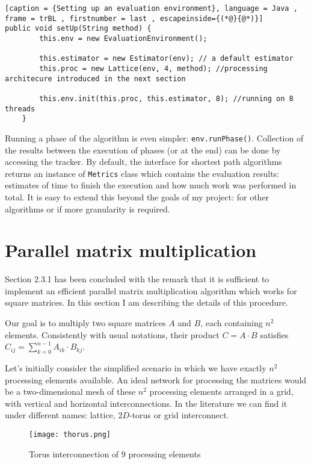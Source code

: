 \documentclass[12pt,a4paper,twoside,openright]{report}
\begin{document}
\begin{lstlisting}[caption = {Setting up an evaluation environment}, language = Java , frame = trBL , firstnumber = last , escapeinside={(*@}{@*)}]
public void setUp(String method) {
        this.env = new EvaluationEnvironment();

        this.estimator = new Estimator(env); // a default estimator
        this.proc = new Lattice(env, 4, method); //processing architecure introduced in the next section

        this.env.init(this.proc, this.estimator, 8); //running on 8 threads
    }

\end{lstlisting}

Running a phase of the algorithm is even simpler: \texttt{env.runPhase()}. Collection of the results between the execution of phases (or at the end) can be done by accessing the tracker. By default, the interface for shortest path algorithms returns an instance of \texttt{Metrics} class which contains the evaluation results: estimates of time to finish the execution and how much work was performed in total. It is easy to extend this beyond the goals of my project: for other algorithms or if more granularity is required. 

\section{Parallel matrix multiplication}
Section 2.3.1 has been concluded with the remark that it is sufficient to implement an efficient parallel matrix multiplication algorithm which works for square matrices. In this section I am describing the details of this procedure.

Our goal is to multiply two square matrices $A$ and $B$, each containing $n^2$ elements. Consistently with usual notations, their product $C=A\cdot B$ satisfies $C_{ij} = \sum_{k=0}^{n-1} A_{ik}\cdot B_{kj}$. 

Let's initially consider the simplified scenario in which we have exactly $n^2$ processing elements available. An ideal network for processing the matrices would be a two-dimensional mesh of these $n^2$ processing elements arranged in a grid, with vertical and horizontal interconnections. In the literature we can find it under different names: lattice, $2D$-torus or grid interconnect. 

\begin{figure}[h]
\centering
\texttt{[image: thorus.png]}
\caption{Torus interconnection of $9$ processing elements}
\end{figure}
\end{document}
